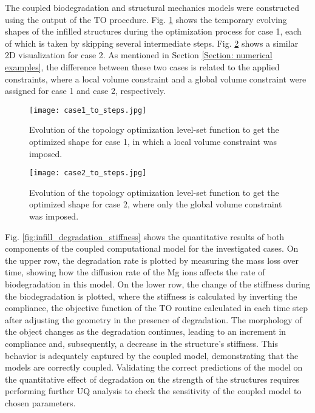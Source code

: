 The coupled biodegradation and structural mechanics models were constructed using the output of the \gls{TO} procedure. Fig. \ref{fig:infill_case1_to_steps} shows the temporary evolving shapes of the infilled structures during the optimization process for case 1, each of which is taken by skipping several intermediate steps. Fig. \ref{fig:infill_case2_to_steps} shows a similar 2D visualization for case 2. As mentioned in Section \ref{Section: numerical examples}, the difference between these two cases is related to the applied constraints, where a local volume constraint and a global volume constraint were assigned for case 1 and case 2, respectively.


\begin{figure}[h]
\centering
\medskip
\texttt{[image: case1\_to\_steps.jpg]}
\caption[Evolution of the topology optimization level-set function for case 1]{Evolution of the topology optimization level-set function to get the optimized shape for case 1, in which a local volume constraint was imposed.} \label{fig:infill_case1_to_steps}
\end{figure}

\begin{figure}[h]
\centering
\medskip
\texttt{[image: case2\_to\_steps.jpg]}
\caption[Evolution of the topology optimization level-set function for case 2]{Evolution of the topology optimization level-set function to get the optimized shape for case 2, where only the global volume constraint was imposed.} \label{fig:infill_case2_to_steps}
\end{figure}


Fig. \ref{fig:infill_degradation_stiffness} shows the quantitative results of both components of the coupled computational model for the investigated cases. On the upper row, the degradation rate is plotted by measuring the mass loss over time, showing how the diffusion rate of the Mg ions affects the rate of biodegradation in this model. On the lower row, the change of the stiffness during the biodegradation is plotted, where the stiffness is calculated by inverting the compliance, the objective function of the \gls{TO} routine calculated in each time step after adjusting the geometry in the presence of degradation. The morphology of the object changes as the degradation continues, leading to an increment in compliance and, subsequently, a decrease in the structure's stiffness. This behavior is adequately captured by the coupled model, demonstrating that the models are correctly coupled. Validating the correct predictions of the model on the quantitative effect of degradation on the strength of the structures requires performing further \gls{UQ} analysis to check the sensitivity of the coupled model to chosen parameters.

